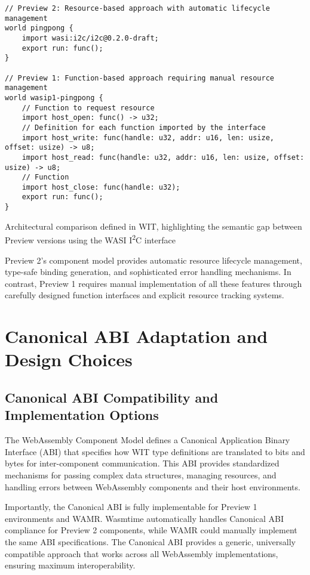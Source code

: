 \begin{listing}[H]
\begin{verbatim}
// Preview 2: Resource-based approach with automatic lifecycle management
world pingpong {
    import wasi:i2c/i2c@0.2.0-draft;
    export run: func();
}

// Preview 1: Function-based approach requiring manual resource management
world wasip1-pingpong {
    // Function to request resource
    import host_open: func() -> u32;
    // Definition for each function imported by the interface
    import host_write: func(handle: u32, addr: u16, len: usize, offset: usize) -> u8;
    import host_read: func(handle: u32, addr: u16, len: usize, offset: usize) -> u8;
    // Function 
    import host_close: func(handle: u32);
    export run: func();
}
\end{verbatim}
\caption{Architectural comparison defined in WIT, highlighting the semantic gap between Preview versions using the WASI I\textsuperscript{2}C interface}
\label{lst:preview-comparison}
\end{listing}

Preview 2's component model provides automatic resource lifecycle management, type-safe binding generation, and sophisticated error handling mechanisms. In contrast, Preview 1 requires manual implementation of all these features through carefully designed function interfaces and explicit resource tracking systems.

\section{Canonical ABI Adaptation and Design Choices}
\label{sec:canonical-abi-adaptation}

\subsection{Canonical ABI Compatibility and Implementation Options}

The WebAssembly Component Model defines a Canonical Application Binary Interface (ABI) that specifies how WIT type definitions are translated to bits and bytes for inter-component communication. This ABI provides standardized mechanisms for passing complex data structures, managing resources, and handling errors between WebAssembly components and their host environments.

Importantly, the Canonical ABI is fully implementable for Preview 1 environments and WAMR. Wasmtime automatically handles Canonical ABI compliance for Preview 2 components, while WAMR could manually implement the same ABI specifications. The Canonical ABI provides a generic, universally compatible approach that works across all WebAssembly implementations, ensuring maximum interoperability.

